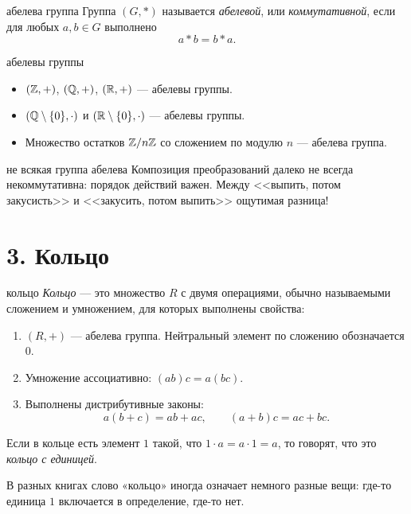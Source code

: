 \begin{defbox}{абелева группа}
Группа $(G,*)$ называется \emph{абелевой}, или \emph{коммутативной}, если для любых $a,b\in G$ выполнено
\[
    a*b=b*a.
\]
\end{defbox}

\begin{examplebox}{абелевы группы}
\begin{itemize}
    \item $(\mathbb{Z},+)$, $(\mathbb{Q},+)$, $(\mathbb{R},+)$ --- абелевы группы.
    \item $(\mathbb{Q}\setminus\{0\},\cdot)$ и $(\mathbb{R}\setminus\{0\},\cdot)$ --- абелевы группы.
    \item Множество остатков $\mathbb{Z}/n\mathbb{Z}$ со сложением по модулю $n$ --- абелева группа.
\end{itemize}
\end{examplebox}

\begin{warningbox}{не всякая группа абелева}
Композиция преобразований далеко не всегда некоммутативна: порядок действий важен. Между <<выпить, потом закусисть>> и <<закусить, потом выпить>> ощутимая разница!
\end{warningbox}

\section*{3. Кольцо}

\begin{defbox}{кольцо}
\emph{Кольцо} --- это множество $R$ с двумя операциями, обычно называемыми сложением и умножением, для которых выполнены свойства:
\begin{enumerate}
    \item $(R,+)$ --- абелева группа. Нейтральный элемент по сложению обозначается $0$.
    \item Умножение ассоциативно: $(ab)c=a(bc)$.
    \item Выполнены дистрибутивные законы:
    \[
        a(b+c)=ab+ac,\qquad (a+b)c=ac+bc.
    \]
\end{enumerate}
Если в кольце есть элемент $1$ такой, что $1\cdot a=a\cdot 1=a$, то говорят, что это \emph{кольцо с единицей}.
\end{defbox}

\begin{remarkbox}
В разных книгах слово «кольцо» иногда означает немного разные вещи: где-то единица $1$ включается в определение, где-то нет.
\end{remarkbox}


